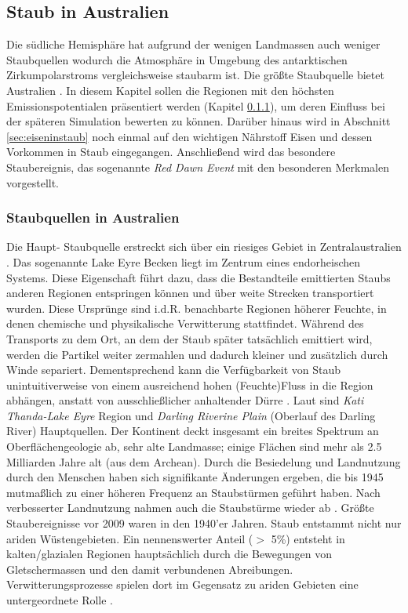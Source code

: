 \documentclass[12pt,a4paper,onecolumn,draft]{scrartcl}
\begin{document}
\subsection{Staub in Australien} \label{sec:Staub}
Die südliche Hemisphäre hat aufgrund der wenigen Landmassen auch weniger Staubquellen wodurch die Atmosphäre in Umgebung des antarktischen Zirkumpolarstroms vergleichsweise staubarm ist. Die größte Staubquelle bietet Australien \citep{Shao.2011}. In diesem Kapitel sollen die Regionen mit den höchsten Emissionspotentialen präsentiert werden (Kapitel \ref{sec:staubquellen}), um deren Einfluss bei der späteren Simulation bewerten zu können. Darüber hinaus wird in Abschnitt \ref{sec:eiseninstaub} noch einmal auf den wichtigen Nährstoff Eisen und dessen Vorkommen in Staub eingegangen. Anschließend wird das besondere Staubereignis, das sogenannte \textit{Red Dawn Event} mit den besonderen Merkmalen vorgestellt.
\subsubsection{Staubquellen in Australien} \label{sec:staubquellen}
Die Haupt- Staubquelle erstreckt sich über ein riesiges Gebiet in Zentralaustralien \citep{Shao.2011}. Das sogenannte Lake Eyre Becken liegt im Zentrum eines endorheischen Systems. Diese Eigenschaft führt dazu, dass die Bestandteile emittierten Staubs anderen Regionen entspringen können und über weite Strecken transportiert wurden. Diese Ursprünge sind i.d.R. benachbarte Regionen höherer Feuchte, in denen chemische und physikalische Verwitterung stattfindet. Während des Transports zu dem Ort, an dem der Staub später tatsächlich emittiert wird, werden die Partikel weiter zermahlen und dadurch kleiner und zusätzlich durch Winde separiert. Dementsprechend kann die Verfügbarkeit von Staub unintuitiverweise von einem ausreichend hohen (Feuchte)Fluss in die Region abhängen, anstatt von ausschließlicher anhaltender Dürre \citep{Marx.2018}.
Laut \citet{Deckker.2019} sind \textit{Kati Thanda-Lake Eyre} Region und \textit{Darling Riverine Plain} (Oberlauf des Darling River) Hauptquellen. Der Kontinent deckt insgesamt ein breites Spektrum an Oberflächengeologie ab, sehr alte Landmasse; einige Flächen sind mehr als 2.5 Milliarden Jahre alt (aus dem Archean). Durch die Besiedelung und Landnutzung durch den Menschen haben sich signifikante Änderungen ergeben, die bis 1945 mutmaßlich zu einer höheren Frequenz an Staubstürmen geführt haben. Nach verbesserter Landnutzung nahmen auch die Staubstürme wieder ab \citep{Deckker.2019}. Größte Staubereignisse vor 2009 waren in den 1940'er Jahren. Staub entstammt nicht nur ariden Wüstengebieten. Ein nennenswerter Anteil ($>$ 5\%) entsteht in kalten/glazialen Regionen hauptsächlich durch die Bewegungen von Gletschermassen und den damit verbundenen Abreibungen. Verwitterungsprozesse spielen dort im Gegensatz zu ariden Gebieten eine untergeordnete Rolle \citep{Marx.2018}.
\end{document}
